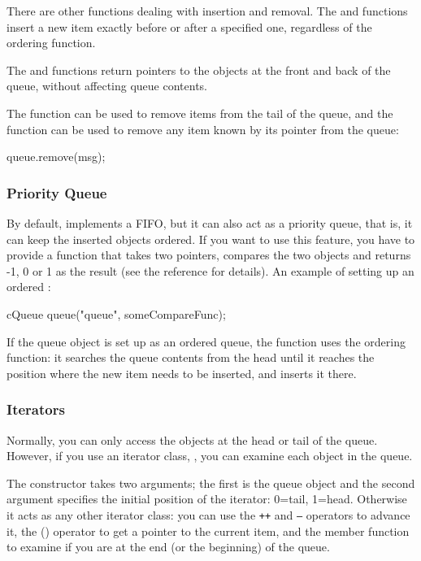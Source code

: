 There are other functions dealing with insertion and removal.  The
 and  functions insert a
new item exactly before or after a specified one, regardless of the
ordering function.

The  and  functions return pointers to the objects
at the front and back of the queue, without affecting queue contents.

The  function can be used to remove items from the
tail of the queue, and the  function can be
used to remove any item known by its pointer from the queue:

\begin{cpp}
queue.remove(msg);
\end{cpp}



\subsubsection{Priority Queue}


By default,  implements a FIFO, but it can also act as
a priority queue, that is, it can keep the inserted objects
ordered.  If you want to use this feature, you have
to provide a function that takes two  pointers,
compares the two objects and returns -1, 0 or 1 as the result (see the
reference for details).  An example of setting up an ordered
:

\begin{cpp}
cQueue queue("queue", someCompareFunc);
\end{cpp}


If the queue object is set up as an ordered queue, the 
function uses the ordering function: it searches the queue contents
from the head until it reaches the position where the new item
needs to be inserted, and inserts it there.


\subsubsection{Iterators}


Normally, you can only access the objects at the head or tail of the
queue. However, if you use an iterator class, ,
you can examine each object in the queue.

The  constructor takes two arguments; the first
is the queue object and the second argument specifies the initial position
of the iterator: 0=tail, 1=head. Otherwise it acts as any other
{\opp} iterator class: you can use the \texttt{++} and \texttt{--} operators to advance
it, the () operator to get a pointer to the current item, and the
 member function to examine if you are at the end (or the
beginning) of the queue.


